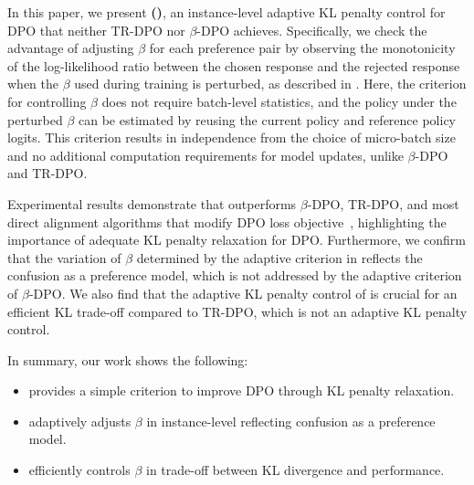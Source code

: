 In this paper, we present \textbf{\methodbfull{} (\methodb{})}, an instance-level adaptive KL penalty control for DPO that neither TR-DPO nor $\beta$-DPO achieves. Specifically, we check the advantage of adjusting $\beta$ for each preference pair by observing the monotonicity of the log-likelihood ratio between the chosen response and the rejected response when the $\beta$ used during training is perturbed, as described in . Here, the criterion for controlling $\beta$ does not require batch-level statistics, and the policy under the perturbed $\beta$ can be estimated by reusing the current policy and reference policy logits. This criterion results in independence from the choice of micro-batch size and no additional computation requirements for model updates, unlike $\beta$-DPO and TR-DPO.

Experimental results demonstrate that \method{} outperforms $\beta$-DPO, TR-DPO, and most direct alignment algorithms that modify DPO loss objective~\cite{yuan2023rrhf, zhao2023slic, azar2024general, xu2024contrastive, ethayarajh2024kto, hong2024orpo, park2024disentangling, meng2024simpo}, highlighting the importance of adequate KL penalty relaxation for DPO. Furthermore, we confirm that the variation of $\beta$ determined by the adaptive criterion in \method{} reflects the confusion as a preference model, which is not addressed by the adaptive criterion of $\beta$-DPO. We also find that the adaptive KL penalty control of \method{} is crucial for an efficient KL trade-off compared to TR-DPO, which is not an adaptive KL penalty control.

In summary, our work shows the following:
\begin{itemize}
    \setlength\itemsep{0em}
  \item \method{} provides a simple criterion to improve DPO through KL penalty relaxation.
  \item \method{} adaptively adjusts $\beta$ in instance-level reflecting confusion as a preference model.
  \item \method{} efficiently controls $\beta$ in trade-off between KL divergence and performance.
\end{itemize}